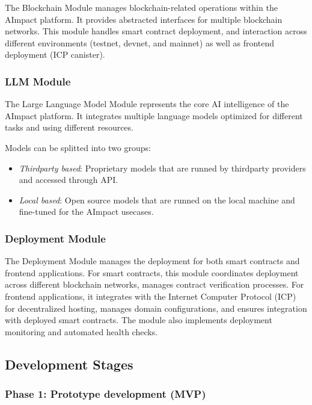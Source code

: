 \documentclass[12pt,a4paper]{article}
\begin{document}
The Blockchain Module manages blockchain-related operations within the AImpact platform. 
It provides abstracted interfaces for multiple blockchain networks. 
This module handles smart contract deployment, and interaction across different environments (testnet, devnet, and mainnet) 
as well as frontend deployment (ICP canister). 


\subsubsection{LLM Module}

The Large Language Model Module represents the core AI intelligence of the AImpact platform. 
It integrates multiple language models optimized for different tasks and using different resources. 

Models can be splitted into two groups:
\begin{itemize}
    \item \textit{Thirdparty based}: Proprietary models that are runned by thirdparty providers and accessed through API.
    \item \textit{Local based}: Open source models that are runned on the local machine and fine-tuned for the AImpact usecases.
\end{itemize}



\subsubsection{Deployment Module}

The Deployment Module manages the deployment for both smart contracts and frontend applications. 
For smart contracts, this module coordinates deployment across different blockchain networks, manages contract verification processes. 
For frontend applications, it integrates with the Internet Computer Protocol (ICP) for decentralized hosting, 
manages domain configurations, and ensures integration with deployed smart contracts. 
The module also implements deployment monitoring and automated health checks.


\subsection{Development Stages}

\subsubsection{Phase 1: Prototype development (MVP)}
\end{document}
